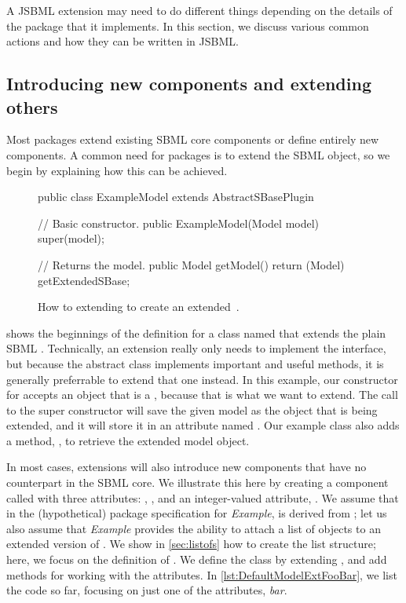 A JSBML extension may need to do different things depending on the details
of the \SBMLthree package that it implements.  In this section, we discuss
various common actions and how they can be written in JSBML.


\subsection{Introducing new components and extending others}
\label{subsec:addingClasses}

Most \SBMLthree packages extend existing SBML core components or define
entirely new components.  A common need for packages is to extend the SBML
\Model object, so we begin by explaining how this can be achieved.

\begin{figure}[t]
  \begin{example}[numbers=left]
public class ExampleModel extends AbstractSBasePlugin {

  // Basic constructor.
  public ExampleModel(Model model) {
    super(model);
  }

  // Returns the model.
  public Model getModel() {
    return (Model) getExtendedSBase;
  }
}\end{example}
  \caption{How to extending \AbstractSBasePlugin to create an extended
    \,\Model.}
  \label{lst:ModelExtClass}
\end{figure}

 shows the beginnings of the definition for
a class named  that extends the plain SBML
\Model. Technically, an extension really only needs to implement the
\SBasePlugin interface, but because the abstract class \AbstractSBasePlugin
implements important and useful methods, it is generally preferrable to
extend that one instead.  In this example, our constructor for
 accepts an object that is a \Model, because that is
what we want to extend.  The call to the super constructor will save the
given model as the \SBase object that is being extended, and it will store
it in an attribute named . Our example
 class also adds a method, , to
retrieve the extended model object.

In most cases, extensions will also introduce new components that have no
counterpart in the SBML core.  We illustrate this here by creating a
component called  with three attributes: , ,
and an integer-valued attribute, .  We assume that in the
(hypothetical) package specification for \emph{Example},  is
derived from \SBase; let us also assume that \emph{Example} provides the
ability to attach a list of  objects to an extended version of
\Model.  We show in \vref{sec:listofs} how to create the list
structure; here, we focus on the definition of .  We define the
class  by extending \AbstractSBasePlugin, and add methods for
working with the attributes.  In \vref{lst:DefaultModelExtFooBar},
we list the code so far, focusing on just one of the attributes,
\emph{bar}.

